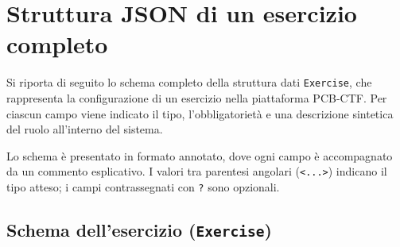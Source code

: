 \chapter{Struttura JSON di un esercizio completo}
\label{chap:appendice-a}

Si riporta di seguito lo schema completo della struttura dati \texttt{Exercise}, che rappresenta la configurazione di un esercizio nella piattaforma PCB-CTF. Per ciascun campo viene indicato il tipo, l'obbligatorietà e una descrizione sintetica del ruolo all'interno del sistema.

Lo schema è presentato in formato annotato, dove ogni campo è accompagnato da un commento esplicativo. I valori tra parentesi angolari (\texttt{<...>}) indicano il tipo atteso; i campi contrassegnati con \texttt{?} sono opzionali.

\section{Schema dell'esercizio (\texttt{Exercise})}

